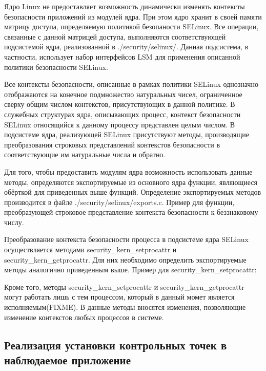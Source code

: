 Ядро Linux не предоставляет возможность динамически изменять
контексты безопасности приложений из модулей ядра. При этом
ядро хранит в своей памяти матрицу доступа, определяемую
политикой безопаности SELinux. Все операции, связанные с
данной матрицей доступа, выполняются соответствующей подсистемой
ядра, реализованной в ./security/selinux/. Данная подсистема,
в частности, использует набор интерфейсов LSM для применения
описанной политики безопасности SELinux.

Все контексты безопасности, описанные в рамках политики SELinux
однозначно отображаются на конечное подмножество натуральных чисел,
ограниченное сверху общим числом контекстов, присутствующих в
данной политике. В служебных структурах ядра, описывающих процесс,
контекст безопасности SELinux относящийся к данному процессу
представлен целым числом. В подсистеме ядра, реализующей SELinux
присутствуют методы, производящие преобразования строковых
представлений контекстов безопасности в соответствующие им
натуральные числа и обратно.



Для того, чтобы предоставить модулям ядра возможность использовать
данные методы, определяются экспортируемые из основного ядра функции,
являющиеся обёрткой для приведенных выше функций. Определение
экспортируемых методов производится в файле ./security/selinux/exports.c.
Пример для функции, преобразующей строковое представление контекста
безопасности к беззнаковому числу.



Преобразование контекста безопасности процесса в подсистеме ядра SELinux
осуществляется методами security\_kern\_setprocattr и
security\_kern\_getprocattr. Для них необходимо определить
экспортируемые методы аналогично приведенным выше. Пример для
security\_kern\_setprocattr:



Кроме того, методы security\_kern\_setprocattr и
security\_kern\_getprocattr могут работать лишь с тем процессом,
который в данный момет является исполняемым(FIXME). В данные методы
вносятся изменения, позволяющие изменение контекстов любых процессов
в системе.

\subsection{Реализация установки контрольных точек в наблюдаемое
            приложение}


